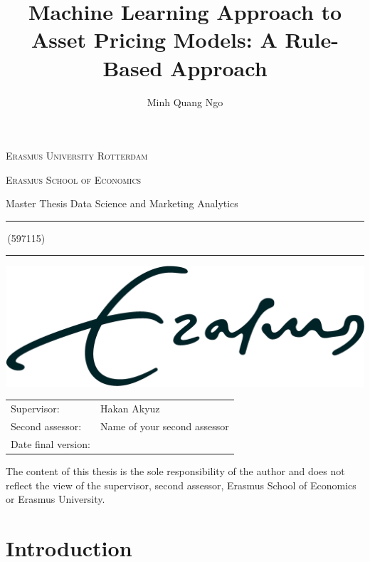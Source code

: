 \documentclass[a4paper,11pt]{article}
\author{Minh Quang Ngo}
\title{Machine Learning Approach to Asset Pricing Models: A Rule-Based Approach}
\newcommand{\studentnumber}{597115}
\newcommand{\program}{Data Science and Marketing Analytics}
\newcommand{\supervisor}{Hakan Akyuz}
\newcommand{\secondassesor}{Name of your second assessor}
\begin{document}
\begin{titlepage}
\makeatletter
\begin{center}
	\textsc{Erasmus University Rotterdam}
	\par \textsc{Erasmus School of Economics}
	\par Master Thesis \program

	\vfill \hrule height .08em \bigskip
	\par\huge\@title\bigskip
	\par\Large\@author\,(\studentnumber)\bigskip
	\hrule height .08em\normalsize
	
	\vfill
	\includegraphics[width=\textwidth,height=0.15\textheight,keepaspectratio]{eur} %
	\vfill
	
	\begin{tabular}{ll}
		\toprule
		Supervisor: & \supervisor\\
		Second assessor: & \secondassesor\\
		Date final version: & \@date\\
		\bottomrule
	\end{tabular}
	
	\vfill
	The content of this thesis is the sole responsibility of the author and does not reflect the view of the supervisor, second assessor, Erasmus School of Economics or Erasmus University.
\end{center}
\makeatother
\end{titlepage}

\begin{abstract}
	
\end{abstract}
\newpage

\tableofcontents
\newpage

\section{Introduction} \label{sec:introduction}
    
\end{document}
